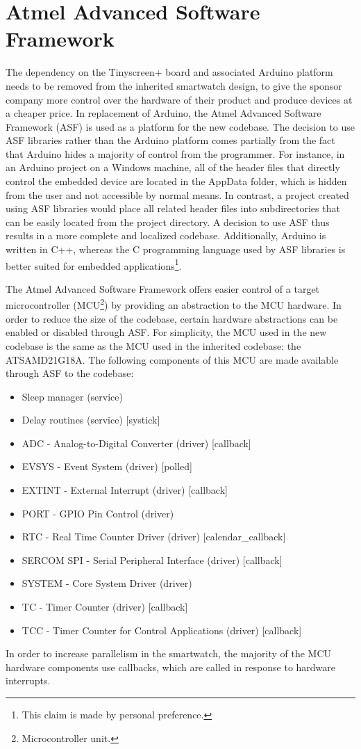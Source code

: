 \section{Atmel Advanced Software Framework}
The dependency on the Tinyscreen+ board and associated Arduino platform needs to be removed from the inherited smartwatch design, to give the sponsor company more control over the hardware of their product and produce devices at a cheaper price. In replacement of Arduino, the Atmel Advanced Software Framework (ASF)\cite{ASF} is used as a platform for the new codebase. The decision to use ASF libraries rather than the Arduino platform comes partially from the fact that Arduino hides a majority of control from the programmer. For instance, in an Arduino project on a Windows machine, all of the header files that directly control the embedded device are located in the AppData folder, which is hidden from the user and not accessible by normal means. In contrast, a project created using ASF libraries would place all related header files into subdirectories that can be easily located from the project directory. A decision to use ASF thus results in a more complete and localized codebase. Additionally, Arduino is written in C++, whereas the C programming language used by ASF libraries is better suited for embedded applications\footnote{This claim is made by personal preference.}.

The Atmel Advanced Software Framework offers easier control of a target microcontroller (MCU\footnote{Microcontroller unit.}) by providing an abstraction to the MCU hardware. In order to reduce the size of the codebase, certain hardware abstractions can be enabled or disabled through ASF. For simplicity, the MCU used in the new codebase is the same as the MCU used in the inherited codebase: the ATSAMD21G18A\cite{samd21}. The following components of this MCU are made available through ASF to the codebase:

\singlespacing
\begin{itemize}
  \item{} Sleep manager (service)
  \item{} Delay routines (service) [systick]
  \item{} ADC - Analog-to-Digital Converter (driver) [callback]
  \item{} EVSYS - Event System (driver) [polled]
  \item{} EXTINT - External Interrupt (driver) [callback]
  \item{} PORT - GPIO Pin Control (driver)
  \item{} RTC - Real Time Counter Driver (driver) [calendar\_callback]
  \item{} SERCOM SPI - Serial Peripheral Interface (driver) [callback]
  \item{} SYSTEM - Core System Driver (driver)
  \item{} TC - Timer Counter (driver) [callback]
  \item{} TCC - Timer Counter for Control Applications (driver) [callback]
\end{itemize}
\doublespacing
In order to increase parallelism in the smartwatch, the majority of the MCU hardware components use callbacks, which are called in response to hardware interrupts.

